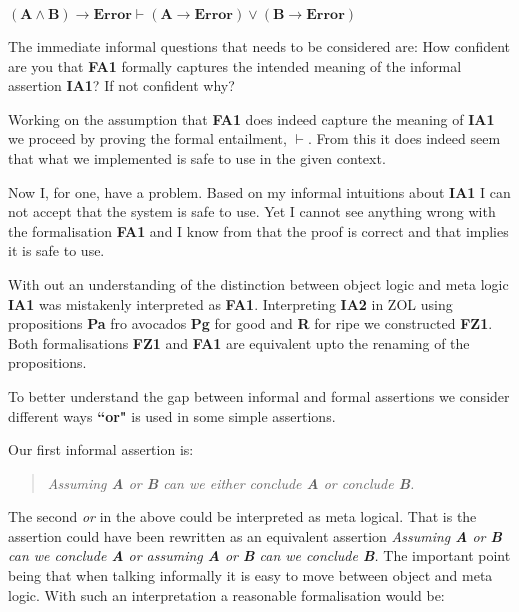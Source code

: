 \hspace{\fill}   $\mathbf{(A\wedge B)   \rightarrow Error} \vdash \mathbf{(A\rightarrow Error)\vee (B\rightarrow Error)}$\hspace{\fill}{\bf FA1} \label{page:FA1}

\noindent The immediate informal questions that needs to  be considered are: How confident are you that {\bf FA1} formally captures the intended meaning of the informal assertion {\bf IA1}? If not confident why?

 Working on the assumption that {\bf FA1} does indeed capture the meaning of {\bf IA1} we proceed by proving the formal   entailment, $\vdash$. From this  it does indeed seem that what we implemented is safe to use in the given context.



Now I, for one, have a problem.  Based on my informal intuitions about {\bf IA1} I can not accept that  the system is safe to use. Yet I  cannot see anything wrong with the formalisation {\bf FA1} and I know from  that the proof is correct and that implies it is safe to use.  


 With out an  understanding of the distinction between object logic and meta logic {\bf IA1} was mistakenly interpreted as {\bf FA1}.
Interpreting  {\bf IA2} in ZOL  using propositions {\bf Pa} fro avocados {\bf Pg} for good and {\bf R} for ripe we constructed {\bf FZ1}. Both formalisations {\bf FZ1} and {\bf FA1} are equivalent upto the renaming of the propositions.



 
 To better understand the gap between informal and formal assertions  we consider different ways  {\bf ``or"} is used in some simple assertions.


Our first informal assertion is:
\begin{quote}
 \emph{Assuming  {\bf A} or  {\bf B}  can we either conclude  {\bf A}  or conclude  {\bf B}.\hspace{\fill}{\bf OR1}}
 \end{quote}

The second \emph{or} in the above could be interpreted as meta logical. That  is the assertion could have been rewritten as an equivalent assertion \emph{Assuming  {\bf A} or  {\bf B}  can we conclude  {\bf A}  or assuming  {\bf A} or  {\bf B}  can we conclude  {\bf B}. } 
The important point being that when talking informally  it is easy to move between object and meta logic.  With such an interpretation a reasonable formalisation   would be:

